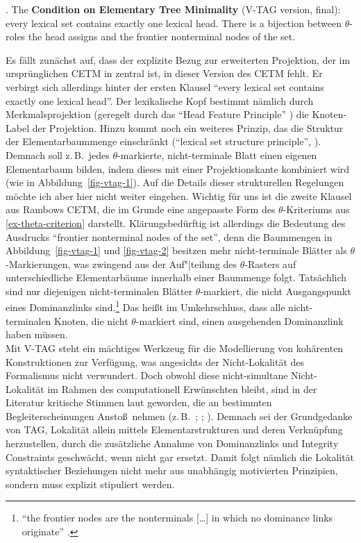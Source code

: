 \ex. The {\bf Condition on Elementary Tree Minimality} (V-TAG version, final): every lexical set contains exactly one lexical head. There is a bijection between $\theta$-roles the head assigns and the frontier nonterminal nodes of the set. \citep[149]{Rambow:94} \label{ex-vtag-cetm}

Es fällt zunächst auf, dass der explizite Bezug zur erweiterten Projektion, der im ursprünglichen CETM in \cite{Frank:92,Frank:02} zentral ist, in dieser Version des CETM fehlt. Er verbirgt sich allerdings hinter der ersten Klausel "`every lexical set contains exactly one lexical head"'. Der lexikalische Kopf bestimmt nämlich durch Merkmalsprojektion (geregelt durch das "`Head Feature Principle"' \citep[141f]{Rambow:94}) die Knoten-Label der Projektion. Hinzu kommt noch ein weiteres Prinzip, das die Struktur der Elementarbaummenge einschränkt ("`lexical set structure principle"', \citealt[149]{Rambow:94}). Demnach soll z.\,B.\ jedes $\theta$-markierte, nicht-terminale Blatt einen eigenen Elementarbaum bilden, indem dieses mit einer Projektionskante kombiniert wird (wie in Abbildung~\ref{fig-vtag-1}). Auf die Details dieser strukturellen Regelungen möchte ich aber hier nicht weiter eingehen. Wichtig für uns ist die zweite Klausel aus Rambows CETM, die im Grunde eine angepasste Form des $\theta$-Kriteriums aus \ref{ex-theta-criterion} darstellt. Klärungsbedürftig ist allerdings die Bedeutung des Ausdrucks "`frontier nonterminal nodes of the set"', denn die Baummengen in Abbildung~\ref{fig-vtag-1} und \ref{fig-vtag-2} besitzen mehr nicht-terminale Blätter als $\theta$-Markierungen, was zwingend aus der Auf"|teilung des $\theta$-Rasters auf unterschiedliche Elementarbäume innerhalb einer Baummenge folgt. Tatsächlich sind nur diejenigen nicht-terminalen Blätter $\theta$-markiert, die nicht Ausgangspunkt eines Dominanzlinks sind.\footnote{"`the frontier nodes are the nonterminals [\ldots] in which no dominance links originate"' \cite[148,Fußnote~14]{Rambow:94}.} Das hei\ss t im Umkehrschluss, dass alle nicht-terminalen Knoten, die nicht $\theta$-markiert sind, einen ausgehenden Dominanzlink haben müssen. \\  

Mit V-TAG steht ein mächtiges Werkzeug für die Modellierung von kohärenten Konstruktionen zur Verfügung, was angesichts der Nicht-Lokalität des Formalismus nicht verwundert. Doch obwohl diese nicht-simultane Nicht-Lokalität im Rahmen des computationell Erwünschten bleibt, sind in der Literatur kritische Stimmen laut geworden, die an bestimmten Begleiterscheinungen Ansto\ss \ nehmen (z.\,B.\ \citealt[60]{Kulick:00}; \citealt[239]{Frank:02}; \citealt[191]{Kallmeyer:05}). Demnach sei der Grundgedanke von TAG, Lokalität allein mittels Elementarstrukturen und deren Verknüpfung herzustellen, durch die zusätzliche Annahme von Dominanzlinks und Integrity Constraints geschwächt, wenn nicht gar ersetzt. Damit folgt nämlich die Lokalität syntaktischer Beziehungen nicht mehr aus unabhängig motivierten Prinzipien, sondern muss explizit stipuliert werden.



